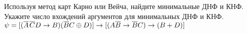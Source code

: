 \question Используя метод карт Карно или Вейча, найдите минимальные ДНФ и КНФ. Укажите число вхождений аргументов для минимальных ДНФ и КНФ.
$\psi = [(\overline{A}\hspace{.1em}\overline{C}D \rightarrow B)(\overline{B}C \oplus D)] \rightarrow [(A\overline{B} \rightarrow \overline{B}C) \rightarrow (B+D)]$